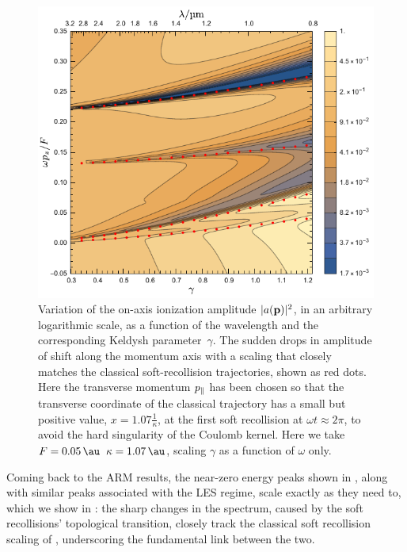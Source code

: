 
\begin{figure}[hbt]
  \centering
  \includegraphics[scale=1]{6-LES/Figures/figure6-2C.pdf}
  \caption[
  Scaling of the ARM spectrum, including LES and NZES peaks, as a function of $\gamma$ and the wavelength
  ]{
  Variation of the on-axis ionization amplitude $|a(\vb{p})|^2$, in an arbitrary logarithmic scale, as a function of the wavelength and the corresponding Keldysh parameter~$\gamma$. The sudden drops in amplitude of  shift along the momentum axis with a scaling that closely matches the classical soft-recollision trajectories, shown as red dots. Here the transverse momentum ${p_{\parallel}}$ has been chosen so that the transverse coordinate of the classical trajectory has a small but positive value, $x = 1.07\tfrac{1}{\kappa}$, at the first soft recollision at $\omega t\approx 2\pi$, to avoid the hard singularity of the Coulomb kernel. 
  Here we take $F=\SI{\figuresixtwoCfield}{\au}$ $\kappa=\SI{\figuresixtwoCkappa}{\au}$, scaling $\gamma$ as a function of $\omega$ only.
  }
\label{f6-spectrum-scaling}
\end{figure}





Coming back to the ARM results, the near-zero energy peaks shown in , along with similar peaks associated with the LES regime, scale exactly as they need to, which we show in : the sharp changes in the spectrum, caused by the soft recollisions' topological transition, closely track the classical soft recollision scaling of , underscoring the fundamental link between the two.


